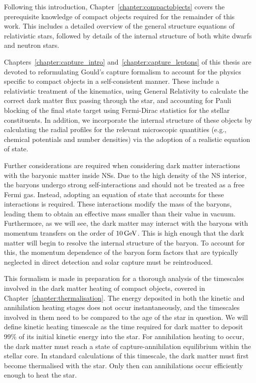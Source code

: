 Following this introduction, Chapter~\ref{chapter:compactobjects} covers the prerequisite knowledge of compact objects
required for the remainder of this work. This includes a detailed overview of the general structure equations of relativistic stars, followed by details of the internal structure of both white dwarfs and neutron stars. 

Chapters~\ref{chapter:capture_intro} and~\ref{chapter:capture_leptons} of this thesis are devoted to reformulating Gould's capture formalism to account for the physics specific to compact objects in a self-consistent manner. These include a relativistic treatment of the kinematics, using General Relativity to calculate the correct dark matter flux passing through the star, and accounting for Pauli blocking of the final state target using Fermi-Dirac statistics for the stellar constituents. In addition, we incorporate the internal structure of these objects by calculating the radial profiles for the relevant microscopic quantities (e.g., chemical potentials and number densities) via the adoption of a realistic equation of state.

Further considerations are required when considering dark matter interactions with the baryonic matter inside NSs. Due to the high density of the NS interior, the baryons undergo strong self-interactions and should not be treated as a free Fermi gas. Instead, adopting an equation of state that accounts for these interactions is required. These interactions modify the mass of the baryons, leading them to obtain an effective mass smaller than their value in vacuum. Furthermore, as we will see, the dark matter may interact with the baryons with momentum transfers on the order of $10{\rm \,GeV}$. This is high enough that the dark matter will begin to resolve the internal structure of the baryon. To account for this, the momentum dependence of the baryon form factors that are typically neglected in direct detection and solar capture must be reintroduced.

This formalism is made in preparation for a thorough analysis of the timescales involved in the dark matter heating of compact objects, covered in Chapter~\ref{chapter:thermalisation}. The energy deposited in both the kinetic and annihilation heating stages does not occur instantaneously, and the timescales involved in them need to be compared to the age of the star in question. We will define kinetic heating timescale as the time required for dark matter to deposit 99\% of its initial kinetic energy into the star. For annihilation heating to occur, the dark matter must reach a state of capture-annihilation equilibrium within the stellar core. In standard calculations of this timescale, the dark matter must first become thermalised with the star. Only then can annihilations occur efficiently enough to heat the star. 


